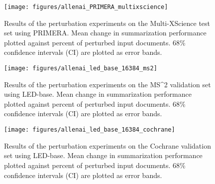 \documentclass[11pt]{article}
\newcommand\mstoo{{MS\^{}2}\xspace}
\begin{document}
\begin{figure}[t]
\centering
\texttt{[image: figures/allenai\_PRIMERA\_multixscience]}
\caption{Results of the perturbation experiments on the Multi-XScience test set using PRIMERA. Mean change in summarization performance plotted against percent of perturbed input documents. 68\% confidence intervals (CI) are plotted as error bands.}
\label{fig:primera-multixscience}
\end{figure}

\begin{figure}[t]
\centering
\texttt{[image: figures/allenai\_led\_base\_16384\_ms2]}
\caption{Results of the perturbation experiments on the \mstoo validation set using LED-base. Mean change in summarization performance plotted against percent of perturbed input documents. 68\% confidence intervals (CI) are plotted as error bands.}
\label{fig:led-ms2}
\end{figure}

\begin{figure}[t!]
\centering
\texttt{[image: figures/allenai\_led\_base\_16384\_cochrane]}
\caption{Results of the perturbation experiments on the Cochrane validation set using LED-base. Mean change in summarization performance plotted against percent of perturbed input documents. 68\% confidence intervals (CI) are plotted as error bands.}
\label{fig:led-cochrane}
\end{figure}
\end{document}
